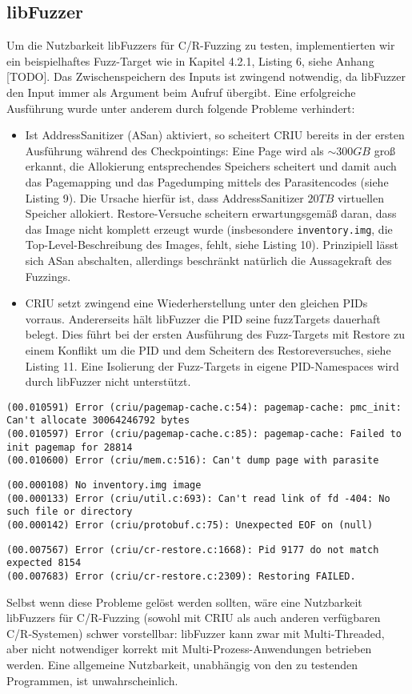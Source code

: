 \documentclass[a4paper]{article}
\begin{document}
\subsection{libFuzzer} %
Um die Nutzbarkeit libFuzzers für C/R-Fuzzing zu testen, implementierten wir ein beispielhaftes Fuzz-Target wie in Kapitel 4.2.1, Listing 6, siehe Anhang [TODO].
Das Zwischenspeichern des Inputs ist zwingend notwendig, da libFuzzer den Input immer als Argument beim Aufruf übergibt. 
Eine erfolgreiche Ausführung wurde unter anderem durch folgende Probleme verhindert:
\begin{itemize}
    \item Ist AddressSanitizer (ASan) aktiviert, so scheitert CRIU bereits in der ersten Ausführung während des Checkpointings: Eine Page wird als $\sim 300GB$ groß erkannt, die Allokierung entsprechendes Speichers scheitert und damit auch das Pagemapping und das Pagedumping mittels des Parasitencodes (siehe Listing 9). Die Ursache hierfür ist, dass AddressSanitizer $20TB$ virtuellen Speicher allokiert. Restore-Versuche scheitern erwartungsgemäß daran, dass das Image nicht komplett erzeugt wurde (insbesondere \texttt{inventory.img}, die Top-Level-Beschreibung des Images, fehlt, siehe Listing 10).
        Prinzipiell lässt sich ASan abschalten, allerdings beschränkt natürlich die Aussagekraft des Fuzzings.
    \item CRIU setzt zwingend eine Wiederherstellung unter den gleichen PIDs vorraus. Andererseits hält libFuzzer die PID seine fuzzTargets dauerhaft belegt. Dies führt bei der ersten Ausführung des Fuzz-Targets mit Restore zu einem Konflikt um die PID und dem Scheitern des Restoreversuches, siehe Listing 11. Eine Isolierung der Fuzz-Targets in eigene PID-Namespaces wird durch libFuzzer nicht unterstützt.
\end{itemize}
\begin{lstlisting}[caption=Pagemapping/dumping Errors mit ASan]
(00.010591) Error (criu/pagemap-cache.c:54): pagemap-cache: pmc_init: Can't allocate 30064246792 bytes
(00.010597) Error (criu/pagemap-cache.c:85): pagemap-cache: Failed to init pagemap for 28814
(00.010600) Error (criu/mem.c:516): Can't dump page with parasite
\end{lstlisting}
\begin{lstlisting}[caption=Restoring Error mit ASan]
(00.000108) No inventory.img image
(00.000133) Error (criu/util.c:693): Can't read link of fd -404: No such file or directory
(00.000142) Error (criu/protobuf.c:75): Unexpected EOF on (null)
\end{lstlisting}
\begin{lstlisting}[caption=Restoring Error durch PID mismatch]
(00.007567) Error (criu/cr-restore.c:1668): Pid 9177 do not match expected 8154
(00.007683) Error (criu/cr-restore.c:2309): Restoring FAILED.
\end{lstlisting}
Selbst wenn diese Probleme gelöst werden sollten, wäre eine Nutzbarkeit libFuzzers für C/R-Fuzzing (sowohl mit CRIU als auch anderen verfügbaren C/R-Systemen) schwer vorstellbar: libFuzzer kann zwar mit Multi-Threaded, aber nicht notwendiger korrekt mit Multi-Prozess-Anwendungen betrieben werden. Eine allgemeine Nutzbarkeit, unabhängig von den zu testenden Programmen, ist unwahrscheinlich.
\end{document}
